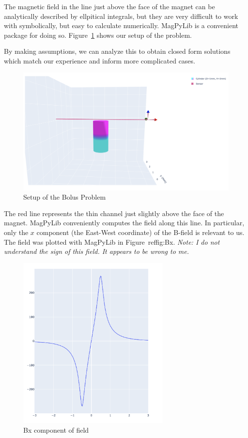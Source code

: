 \documentclass[]{asme2ej}
\begin{document}
The magnetic field in the line just above the face of the magnet can be analytically
described by ellpitical integrals, but they are very difficult to work with symbolically,
but easy to calculate numerically. MagPyLib is a convenient package for doing so.
Figure~\ref{fig:BolusSetup} shows our setup of the problem.

By making assumptions, we can
analyze this to obtain closed form solutions which match our
experience and inform more complicated cases.

\begin{figure}
\centerline{\includegraphics[width=6in]{figure/SetupBolusProblem.png}}
\caption{Setup of the Bolus Problem}
\label{fig:BolusSetup}
\end{figure}

The red line represents the thin channel just slightly above the face of
the magnet.
MagPyLib conveniently computes the field along this line. In particular,
only the $x$ component (the East-West coordinate) of the B-field is relevant to us.
The field was plotted with MagPyLib in Figure~ref{fig:Bx}. {\em Note: I do not understand the sign of this field. It appears to be wrong to me.}

\begin{figure}
\centerline{\includegraphics[width=3in]{figure/Bx.png}}
\caption{Bx component of field}
\label{fig:Bx}
\end{figure}
\end{document}
